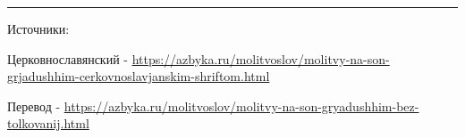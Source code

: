 \documentclass[12pt]{article}
\begin{document}
\pagestyle{empty}
\sloppy

\begin{titlepage}
  \thispagestyle{empty}
  \vspace*{13em}
  {\centering\color{headingcolor}\fontsize{50pt}{60pt}\selectfont{}\par}
\end{titlepage}

\fontsize{14pt}{17pt}\selectfont


\vfill
{%
  \translationfont\fontsize{5pt}{7pt}\selectfont
  \setlength{\parskip}{0pt}
  \noindent\rule{\linewidth}{0.4pt}\par
  \vspace{0.35em}
  \noindent\hspace*{2em}Источники: \par
  \noindent\hspace*{2em}Церковнославянский - \url{https://azbyka.ru/molitvoslov/molitvy-na-son-grjadushhim-cerkovnoslavjanskim-shriftom.html}\par
  \noindent\hspace*{2em}Перевод - \url{https://azbyka.ru/molitvoslov/molitvy-na-son-gryadushhim-bez-tolkovanij.html}\par
}
\end{document}
